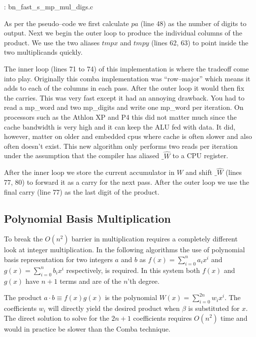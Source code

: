 \documentclass[b5paper]{book}
\begin{document}
\vspace{+3mm}\begin{small}
\hspace{-5.1mm}{\bf File}: bn\_fast\_s\_mp\_mul\_digs.c
\vspace{-3mm}
\begin{alltt}
\end{alltt}
\end{small}

As per the pseudo--code we first calculate $pa$ (line 48) as the number of digits to output.  Next we begin the outer loop
to produce the individual columns of the product.  We use the two aliases $tmpx$ and $tmpy$ (lines 62, 63) to point
inside the two multiplicands quickly.  

The inner loop (lines 71 to 74) of this implementation is where the tradeoff come into play.  Originally this comba 
implementation was ``row--major'' which means it adds to each of the columns in each pass.  After the outer loop it would then fix 
the carries.  This was very fast except it had an annoying drawback.  You had to read a mp\_word and two mp\_digits and write 
one mp\_word per iteration.  On processors such as the Athlon XP and P4 this did not matter much since the cache bandwidth 
is very high and it can keep the ALU fed with data.  It did, however, matter on older and embedded cpus where cache is often 
slower and also often doesn't exist.  This new algorithm only performs two reads per iteration under the assumption that the 
compiler has aliased $\_ \hat W$ to a CPU register.

After the inner loop we store the current accumulator in $W$ and shift $\_ \hat W$ (lines 77, 80) to forward it as 
a carry for the next pass.  After the outer loop we use the final carry (line 77) as the last digit of the product.  

\subsection{Polynomial Basis Multiplication}
To break the $O(n^2)$ barrier in multiplication requires a completely different look at integer multiplication.  In the following algorithms
the use of polynomial basis representation for two integers $a$ and $b$ as $f(x) = \sum_{i=0}^{n} a_i x^i$ and  
$g(x) = \sum_{i=0}^{n} b_i x^i$ respectively, is required.  In this system both $f(x)$ and $g(x)$ have $n + 1$ terms and are of the $n$'th degree.
 
The product $a \cdot b \equiv f(x)g(x)$ is the polynomial $W(x) = \sum_{i=0}^{2n} w_i x^i$.  The coefficients $w_i$ will
directly yield the desired product when $\beta$ is substituted for $x$.  The direct solution to solve for the $2n + 1$ coefficients
requires $O(n^2)$ time and would in practice be slower than the Comba technique.
\end{document}
